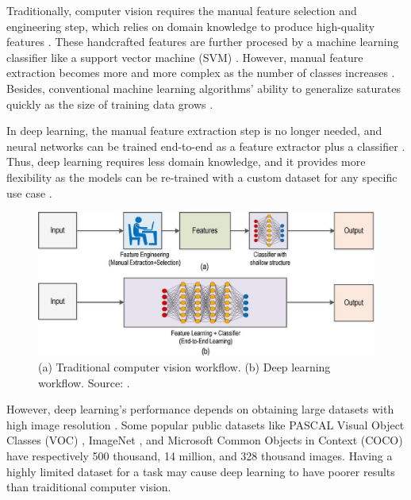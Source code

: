 \documentclass[a4paper, 11pt, oneside]{article}
\begin{document}
  Traditionally, computer vision requires the manual feature selection and engineering step, which relies on domain knowledge
  to produce high-quality features \cite{elgendy2020deep, zhao2019object, o2019deep}. These handcrafted features are further
  procesed by a machine learning classifier like a support vector machine (SVM)
  \cite{elgendy2020deep, zhao2019object, o2019deep}. However, manual feature extraction becomes more and more complex as
  the number of classes increases \cite{o2019deep}. Besides, conventional machine learning algorithms' ability to
  generalize saturates quickly as the size of training data grows \cite{qin2015underwater}.

  In deep learning, the manual feature extraction step is no longer needed, and neural networks can be trained end-to-end
  as a feature extractor plus a classifier \cite{elgendy2020deep, o2019deep}. Thus, deep learning requires less domain
  knowledge, and it provides more flexibility as the models can be re-trained with a custom dataset for any specific use
  case \cite{o2019deep}.

  \begin{figure}[ht]
    \begin{center}
      \includegraphics[width=.8\textwidth]{deep_learning_vs_traditional_computer_vision.png}
    \end{center}
    \caption{(a) Traditional computer vision workflow. (b) Deep learning workflow. Source: \cite{o2019deep}.}
  \end{figure}

  However, deep learning's performance depends on obtaining large datasets with high image resolution \cite{o2019deep}.
  Some popular public datasets like PASCAL Visual Object Classes (VOC) \cite{everingham2010pascal}, ImageNet
  \cite{russakovsky2015imagenet}, and Microsoft Common Objects in Context (COCO) \cite{lin2014microsoft}
  have respectively 500 thousand, 14 million, and 328 thousand images. Having a highly limited dataset for a task may
  cause deep learning to have poorer results than traiditional computer vision.
\end{document}
